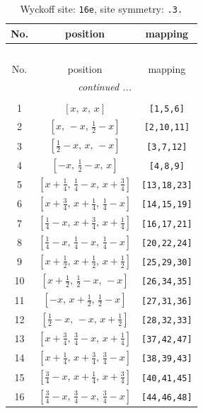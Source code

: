 \documentclass[fleqn,8pt]{jsarticle}
\begin{document}
\begin{longtable}{ccc}
\caption{Wyckoff site: {\tt 16e}, site symmetry: {\tt .3.}}
 \\
 \hline \hline
No. & position & mapping \\ \hline \endfirsthead

\multicolumn{2}{l}{\tablename\ \thetable{}} \\
 \hline \hline
No. & position & mapping \\ \hline \endhead

 \hline \hline
\multicolumn{2}{r}{\footnotesize\it continued ...} \\ \endfoot

 \hline \hline
\multicolumn{2}{r}{} \\ \endlastfoot

1 & $\left[ x,\, x,\, x \right]$ & {\tt [1,5,6]} \\ \hline
2 & $\left[ x,\, - x,\, \frac{1}{2} - x \right]$ & {\tt [2,10,11]} \\ \hline
3 & $\left[ \frac{1}{2} - x,\, x,\, - x \right]$ & {\tt [3,7,12]} \\ \hline
4 & $\left[ - x,\, \frac{1}{2} - x,\, x \right]$ & {\tt [4,8,9]} \\ \hline
5 & $\left[ x + \frac{1}{4},\, \frac{1}{4} - x,\, x + \frac{3}{4} \right]$ & {\tt [13,18,23]} \\ \hline
6 & $\left[ x + \frac{3}{4},\, x + \frac{1}{4},\, \frac{1}{4} - x \right]$ & {\tt [14,15,19]} \\ \hline
7 & $\left[ \frac{1}{4} - x,\, x + \frac{3}{4},\, x + \frac{1}{4} \right]$ & {\tt [16,17,21]} \\ \hline
8 & $\left[ \frac{1}{4} - x,\, \frac{1}{4} - x,\, \frac{1}{4} - x \right]$ & {\tt [20,22,24]} \\ \hline
9 & $\left[ x + \frac{1}{2},\, x + \frac{1}{2},\, x + \frac{1}{2} \right]$ & {\tt [25,29,30]} \\ \hline
10 & $\left[ x + \frac{1}{2},\, \frac{1}{2} - x,\, - x \right]$ & {\tt [26,34,35]} \\ \hline
11 & $\left[ - x,\, x + \frac{1}{2},\, \frac{1}{2} - x \right]$ & {\tt [27,31,36]} \\ \hline
12 & $\left[ \frac{1}{2} - x,\, - x,\, x + \frac{1}{2} \right]$ & {\tt [28,32,33]} \\ \hline
13 & $\left[ x + \frac{3}{4},\, \frac{3}{4} - x,\, x + \frac{1}{4} \right]$ & {\tt [37,42,47]} \\ \hline
14 & $\left[ x + \frac{1}{4},\, x + \frac{3}{4},\, \frac{3}{4} - x \right]$ & {\tt [38,39,43]} \\ \hline
15 & $\left[ \frac{3}{4} - x,\, x + \frac{1}{4},\, x + \frac{3}{4} \right]$ & {\tt [40,41,45]} \\ \hline
16 & $\left[ \frac{3}{4} - x,\, \frac{3}{4} - x,\, \frac{3}{4} - x \right]$ & {\tt [44,46,48]} \\
\end{longtable}
\end{document}
